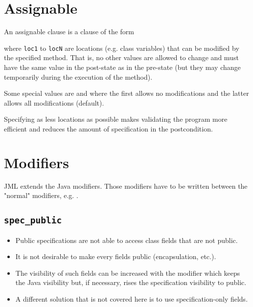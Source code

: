 	\section{Assignable}
		An assignable clause is a clause of the form
		\begin{center}
		\end{center}
		where \texttt{loc1} to \texttt{locN} are locations (e.g. class variables) that can be modified by the specified method. That is, no other values are allowed to change and must have the same value in the post-state as in the pre-state (but they may change temporarily during the execution of the method).

		Some special values are \inlineJava{\\nothing} and \inlineJava{\\everything} where the first allows no modifications and the latter allows all modifications (default).

		Specifying as less locations as possible makes validating the program more efficient and reduces the amount of specification in the postcondition.

	\section{Modifiers}
		\label{sec:additionalmod}

		JML extends the Java modifiers. Those modifiers have to be written between the "normal" modifiers, e.g. .

		\subsection{\texttt{spec\_public}}
			\label{sec:specpub}

			\begin{itemize}
				\item Public specifications are not able to access class fields that are not public.
				\item It is not desirable to make every fields public (encapsulation, etc.).
				\item The visibility of such fields can be increased with the modifier  which keeps the Java visibility but, if necessary, rises the specification visibility to public.
				\item A different solution that is not covered here is to use specification-only fields.
			\end{itemize}

